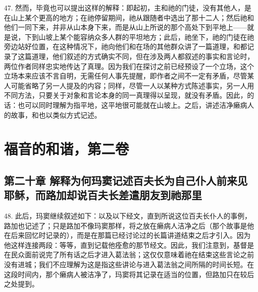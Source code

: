47. 然而，毕竟也可以提出这样的解释：即起初，主和祂的门徒，没有其他人，是在山上某个更高的地方；在祂停留期间，祂从跟随者中选出了那十二人；然后祂和他们一同下来，并非从山本身下来，而是从山上所说的那个高处下到平地上——就是说，下到山坡上某个能容纳众多人群的平坦地方；此后，祂坐下，祂的门徒在祂旁边站好位置，在这种情况下，祂向他们和在场的其他群众讲了一篇道理，和都记录了这篇道理，他们叙述的方式确实不同，但在涉及两人都叙述的事实和言论时，两位作者同样忠实地传达了真理。因为我们在探讨之前已经预设了一个立场，这个立场本来应该不言自明，无需任何人事先提醒，即作者之间不一定有矛盾，尽管某人可能省略了另一人提及的内容；同样，尽管一人以某种方式陈述事实，另一人用不同方法，只要关于对象和言论本身的同一真理得以呈现，就没有矛盾。因此，的话：也可以同时理解为指平地，这平地很可能就在山坡上。之后，讲述洁净癞病人的故事，和也以类似方式记述。\par



\section{福音的和谐，第二卷}


\subsection{第二十章  解释为何玛窦记述百夫长为自己仆人前来见耶稣，而路加却说百夫长差遣朋友到祂那里}

48. 此后，玛窦继续叙述如下：以及以下经文，直到所说这位百夫长仆人的事例，路加也记述了；只是路加不像玛窦那样，将之放在癞病人洁净之后（那个故事是他在后来回忆时记录的），而是在那篇已经讨论过的长篇讲道结束之后才引入。因为他这样连接两段：等等，直到记载他痊愈的那节经文。因此，我们注意到，基督是在民众面前说完了所有话之后才进入葛法翁；这仅仅意味着祂在结束这些言论之前没有进城；我们不应理解为这是指这些讲论与进入葛法翁之间所隔的时间长短。在这段时间内，那个癞病人被洁净了，玛窦将其记录在适当的位置，但路加只在较后之处提到。\par

